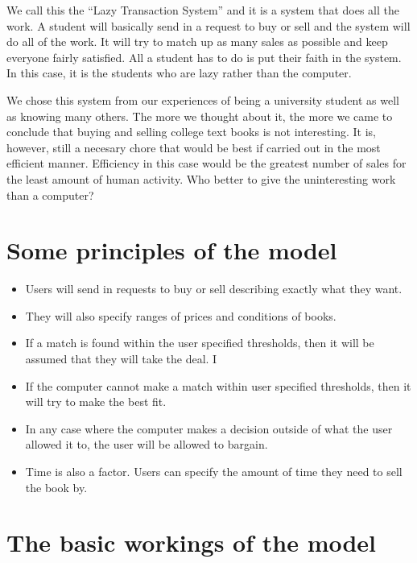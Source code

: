 We call this the  ``Lazy Transaction System'' and it is a system that does all
the work.  A student will 
basically send in a request to buy or sell and the system will do all
of the work.  It will try to match up as many sales as possible and
keep everyone fairly satisfied.  All a student has to do is put their
faith in the system.  In this case, it is the students who are lazy rather than
the computer.

We chose this system from our experiences of being a university student as well
as knowing many others.
The more we thought about it, the more we came to conclude
that buying and selling college text books is not interesting.  It is, however, 
still a necesary chore that would be best if carried out in the most
efficient manner.  Efficiency in this case would be the greatest
number of sales for the least amount of human activity.  Who better to
give the uninteresting work than a computer?

\section{Some principles of the model}

\begin{itemize}

\item Users will send in requests to buy or sell describing exactly what
they want.

\item They will also specify ranges of prices and conditions of
books.

\item If a match is found within the user specified thresholds, then it will
be assumed that they will take the deal.
I
\item If the computer cannot make a match within user specified thresholds,
then it will try to make the best fit.

\item In any case where the computer makes a decision outside of what the
user allowed it to, the user will be allowed to bargain.

\item Time is also a factor.  Users can specify the amount of time they need
to sell the book by.

\end{itemize}

\section{The basic workings of the model}

